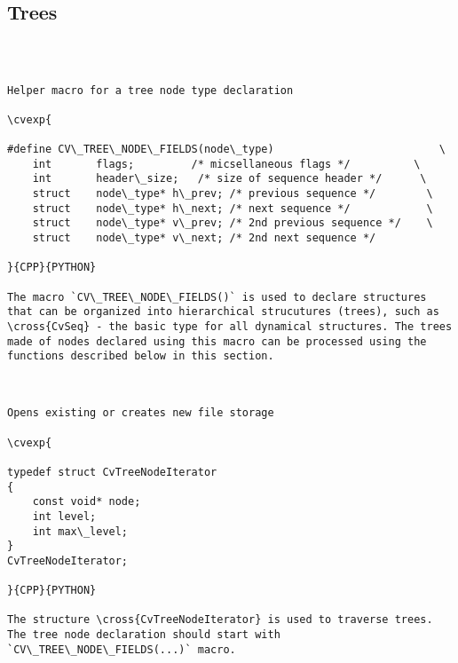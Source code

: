 \subsection{Trees}
\begin{verbatim}


\end{verbatim}
\begin{verbatim}

Helper macro for a tree node type declaration

\cvexp{

#define CV\_TREE\_NODE\_FIELDS(node\_type)                          \
    int       flags;         /* micsellaneous flags */          \
    int       header\_size;   /* size of sequence header */      \
    struct    node\_type* h\_prev; /* previous sequence */        \
    struct    node\_type* h\_next; /* next sequence */            \
    struct    node\_type* v\_prev; /* 2nd previous sequence */    \
    struct    node\_type* v\_next; /* 2nd next sequence */

}{CPP}{PYTHON}

The macro `CV\_TREE\_NODE\_FIELDS()` is used to declare structures that can be organized into hierarchical strucutures (trees), such as \cross{CvSeq} - the basic type for all dynamical structures. The trees made of nodes declared using this macro can be processed using the functions described below in this section.


\end{verbatim}
\begin{verbatim}

Opens existing or creates new file storage

\cvexp{

typedef struct CvTreeNodeIterator
{
    const void* node;
    int level;
    int max\_level;
}
CvTreeNodeIterator;

}{CPP}{PYTHON}

The structure \cross{CvTreeNodeIterator} is used to traverse trees. The tree node declaration should start with `CV\_TREE\_NODE\_FIELDS(...)` macro.


\end{verbatim}
